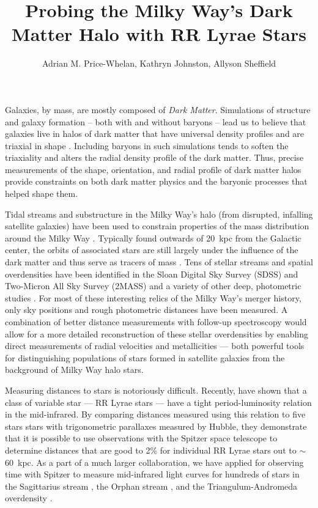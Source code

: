 \documentclass[preprint]{aastex}
\begin{document}
\title{Probing the Milky Way's Dark Matter Halo with RR Lyrae Stars} \author{Adrian M.
  Price-Whelan, Kathryn Johnston,
  Allyson Sheffield} 

Galaxies, by mass, are mostly composed of \emph{Dark
  Matter}. Simulations of structure and galaxy formation -- both with
and without baryons -- lead us to believe that galaxies live in halos of
dark matter that have universal density profiles \citep{nfw96} and are
triaxial in shape \citep{jing02}. Including baryons in such
simulations tends to soften the triaxiality and alters the radial
density profile of the dark matter. Thus, precise measurements of the 
shape, orientation, and radial profile of dark matter halos provide 
constraints on both dark matter physics and the baryonic processes 
that helped shape them. 

Tidal streams and substructure in the Milky Way's 
halo (from disrupted, infalling satellite galaxies) have been used
to constrain properties of the mass distribution around the Milky Way \citep[e.g.,][]{law10}.
Typically found outwards of 20~kpc from the Galactic center, the orbits 
of associated stars are still largely under the influence of the dark matter 
and thus serve as tracers of mass \citep[e.g.,][]{johnston99, pricewhelan13}. 
Tens of stellar 
streams and spatial overdensities have been identified in the Sloan
Digital Sky Survey (SDSS) and Two-Micron All Sky Survey (2MASS)
and a variety of other deep, photometric studies \citep[e.g.,][]{majewski03,belokurov06}. 
For most of these interesting relics of the Milky Way's merger history, 
only sky positions and rough photometric distances have been measured. 
A combination of better distance measurements with follow-up spectroscopy
would allow for a more detailed reconstruction of these stellar overdensities 
by enabling direct measurements of radial velocities and metallicities --- 
both powerful tools for distinguishing populations of stars formed in satellite 
galaxies from the background of Milky Way halo stars.

Measuring distances to stars is notoriously difficult. Recently, \citet{madore12}
have shown that a class of variable star --- RR Lyrae stars --- have a 
tight period-luminosity relation in the mid-infrared. By comparing distances
measured using this relation to five stars stars with trigonometric parallaxes 
measured by Hubble, they demonstrate that it is possible to use observations with
the Spitzer space telescope to determine distances that are good to 2\% for individual RR Lyrae 
stars out to $\sim$60~kpc. As a part of a much
larger collaboration, we have applied for observing time with Spitzer to measure
mid-infrared light curves for hundreds of stars in the Sagittarius stream \citep[Sgr;][]{majewski03},
the Orphan stream \citep[Orp;][]{belokurov07}, and the Triangulum-Andromeda 
overdensity \citep[TriAnd;][]{rochapinto04}.
\end{document}
